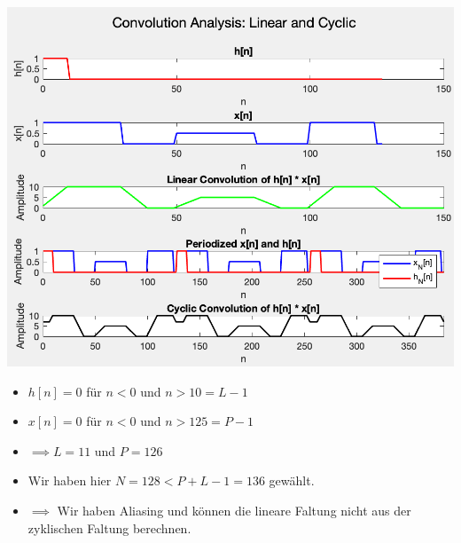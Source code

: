 \documentclass[11pt]{article}
\begin{document}
\vspace*{0.5cm}
\noindent
\begin{minipage}{0.45\textwidth}
    \includegraphics[width=\linewidth]{docimgs/conv_alias.png}
    \vspace*{-0.25cm}
    \begin{itemize}[leftmargin=0pt]
        \item[] $h[n] = 0$ für $n <0$ und $n> 10 = L-1$
        \item[] $x[n] = 0$ für $n <0$ und $n> 125 = P-1 $
        \item[] $\implies L = 11$ und $P = 126$
        \item[] Wir haben hier $N=128 < P + L - 1= 136$ gewählt.
        \item[] $\implies$ Wir haben Aliasing und können die lineare Faltung nicht aus der zyklischen Faltung berechnen.
    \end{itemize}
\end{minipage}
\hfill
\end{document}
